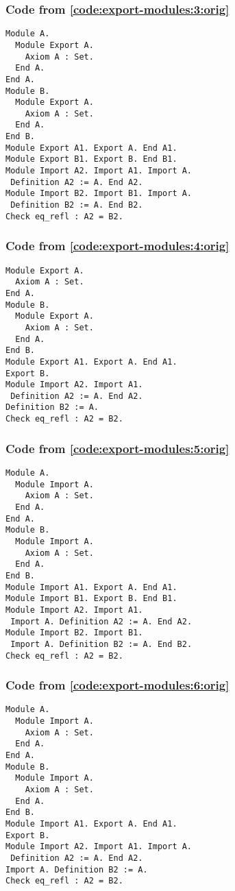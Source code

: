 \documentclass[a4paper,USenglish,cleveref,autoref,thm-restate]{lipics-v2021}
\begin{document}
\subsubsection{Code from \autoref{code:export-modules:3:orig}}\label{code:export-modules:3}
\begin{verbatim}
Module A.
  Module Export A.
    Axiom A : Set.
  End A.
End A.
Module B.
  Module Export A.
    Axiom A : Set.
  End A.
End B.
Module Export A1. Export A. End A1.
Module Export B1. Export B. End B1.
Module Import A2. Import A1. Import A.
 Definition A2 := A. End A2.
Module Import B2. Import B1. Import A.
 Definition B2 := A. End B2.
Check eq_refl : A2 = B2.
\end{verbatim}


\subsubsection{Code from \autoref{code:export-modules:4:orig}}\label{code:export-modules:4}
\begin{verbatim}
Module Export A.
  Axiom A : Set.
End A.
Module B.
  Module Export A.
    Axiom A : Set.
  End A.
End B.
Module Export A1. Export A. End A1.
Export B.
Module Import A2. Import A1.
 Definition A2 := A. End A2.
Definition B2 := A.
Check eq_refl : A2 = B2.
\end{verbatim}

\subsubsection{Code from \autoref{code:export-modules:5:orig}}\label{code:export-modules:5}
\begin{verbatim}
Module A.
  Module Import A.
    Axiom A : Set.
  End A.
End A.
Module B.
  Module Import A.
    Axiom A : Set.
  End A.
End B.
Module Import A1. Export A. End A1.
Module Import B1. Export B. End B1.
Module Import A2. Import A1.
 Import A. Definition A2 := A. End A2.
Module Import B2. Import B1.
 Import A. Definition B2 := A. End B2.
Check eq_refl : A2 = B2.
\end{verbatim}
\subsubsection{Code from \autoref{code:export-modules:6:orig}}\label{code:export-modules:6}
\begin{verbatim}
Module A.
  Module Import A.
    Axiom A : Set.
  End A.
End A.
Module B.
  Module Import A.
    Axiom A : Set.
  End A.
End B.
Module Import A1. Export A. End A1.
Export B.
Module Import A2. Import A1. Import A.
 Definition A2 := A. End A2.
Import A. Definition B2 := A.
Check eq_refl : A2 = B2.
\end{verbatim}
\end{document}
